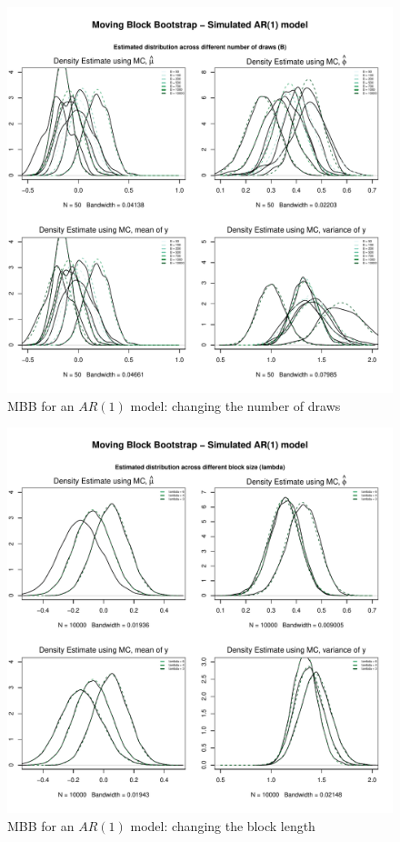 \documentclass{article}
\begin{document}
\begin{figure}[hbt!]
\includegraphics[width=\textwidth]{plots/MBB_AR1_densities_diff_drawsB}
\caption{MBB for an $AR(1)$ model: changing the number of draws}
\label{fig:MBB_AR1_densities_diff_drawsB}
\centering
\end{figure}

\begin{figure}[hbt!]
\includegraphics[width=\textwidth]{plots/MBB_AR1_densities_diff_blocklength}
\caption{MBB for an $AR(1)$ model: changing the block length}
\label{fig:MBB_AR1_densities_diff_blocklength}
\centering
\end{figure}
\end{document}
